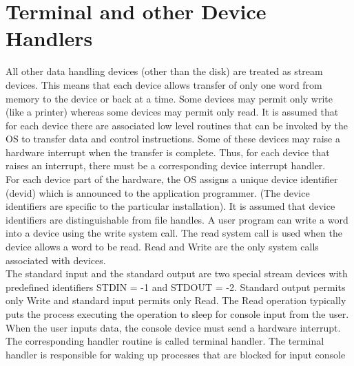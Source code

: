 \section{Terminal and other Device Handlers}
All other data handling devices (other than the disk) are treated as stream devices. This means that each device allows transfer of only one word from memory to the device or back at a time. Some devices may permit only write (like a printer) whereas some devices may permit only read. It is assumed that for each device there are associated low level routines that can be invoked by the OS to transfer data and control instructions. Some of these devices may raise a hardware interrupt when the transfer is complete. Thus, for each device that raises an interrupt, there must be a corresponding device interrupt handler.
\\
For each device part of the hardware, the OS assigns a unique device identifier (devid) which is announced to the application programmer. (The device identifiers are specific to the particular installation). It is assumed that device identifiers are distinguishable from file handles. A user program can write a word into a device using the write system call. The read system call is used when the device allows a word to be read. Read and Write are the only system calls associated with devices.
\\
The standard input and the standard output are two special stream devices with predefined identifiers STDIN = -1 and STDOUT = -2. Standard output permits only Write and standard input permits only Read. The Read operation typically puts the process executing the operation to sleep for console input from the user. When the user inputs data, the console device must send a hardware interrupt. The corresponding handler routine is called terminal handler. The terminal handler is responsible for waking up processes that are blocked for input console
